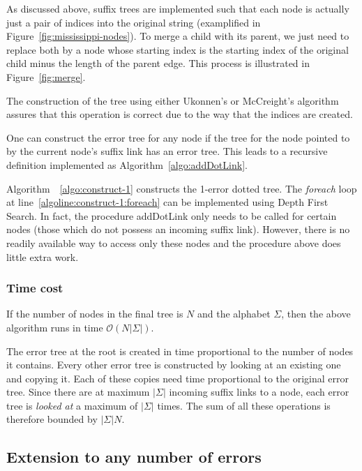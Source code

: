 As discussed above, suffix trees are implemented such that each node is actually just a pair of indices into the original string (examplified in Figure~\ref{fig:mississippi-nodes}). To merge a child with its parent, we just need to replace both by a node whose starting index is the starting index of the original child minus the length of the parent edge. This process is illustrated in Figure~\ref{fig:merge}.

The construction of the tree using either Ukonnen's or McCreight's algorithm assures that this operation is correct due to the way that the indices are created.



One can construct the error tree for any node if the tree for the node pointed to by the current node's suffix link has an error tree. This leads to a recursive definition implemented as Algorithm~\ref{algo:addDotLink}. 



Algorithm~~\ref{algo:construct-1} constructs the 1-error dotted tree. The \textit{foreach} loop at line~\ref{algoline:construct-1:foreach} can be implemented using Depth First Search. In fact, the procedure addDotLink only needs to be called for certain nodes (those which do not possess an incoming suffix link). However, there is no readily available way to access only these nodes and the procedure above does little extra work.

\subsubsection*{Time cost}

If the number of nodes in the final tree is $N$ and the alphabet $\Sigma$, then the above algorithm runs in time $\mathcal{O}(N|\Sigma|)$.

The error tree at the root is created in time proportional to the number of nodes it contains. Every other error tree is constructed by looking at an existing one and copying it. Each of these copies need time proportional to the original error tree. Since there are at maximum $|\Sigma|$ incoming suffix links to a node, each error tree is \emph{looked at} a maximum of $|\Sigma|$ times. The sum of all these operations is therefore bounded by $|\Sigma|N$.

\subsection{Extension to any number of errors}\label{subsec:construct-k-larger-1}

